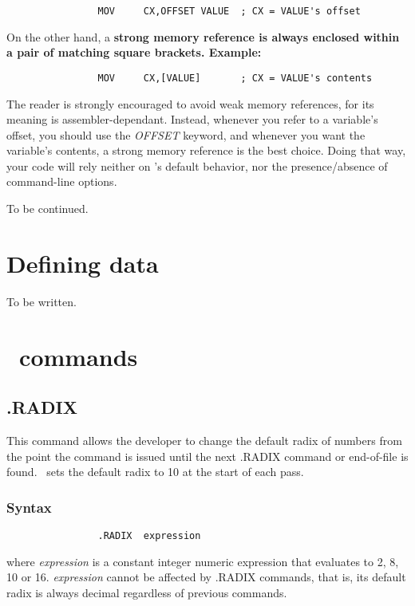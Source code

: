 \documentclass[a4paper,draft,12pt]{book}
\begin{document}
\begin{verbatim}
                MOV     CX,OFFSET VALUE  ; CX = VALUE's offset
\end{verbatim}

On the other hand, a \bf{strong memory reference} is always enclosed within a
pair of matching square brackets. Example:

\begin{verbatim}
                MOV     CX,[VALUE]       ; CX = VALUE's contents
\end{verbatim}

The reader is strongly encouraged to avoid weak memory references, for its
meaning is assembler-dependant. Instead, whenever you refer to a variable's
offset, you should use the \emph{OFFSET} keyword, and whenever you want the
variable's contents, a strong memory reference is the best choice. Doing
that way, your code will rely neither on \popasm's default behavior, nor the
presence/absence of command-line options.

To be continued.

\chapter{Defining data\label{DEFDATA}}
To be written.

\chapter{\popasm\ commands}
\section{.RADIX\label{RADIXCMD}}
This command allows the developer to change the default radix of numbers
from the point the command is issued until the next .RADIX command or
end-of-file is found. \popasm\ sets the default radix to 10 at the start
of each pass.

\subsection{Syntax}

\begin{verbatim}
                .RADIX  expression
\end{verbatim}

\noindent where \emph{expression} is a constant integer numeric expression
that evaluates to 2, 8, 10 or 16. \emph{expression} cannot be affected by
.RADIX commands, that is, its default radix is always decimal regardless
of previous commands.
\end{document}
